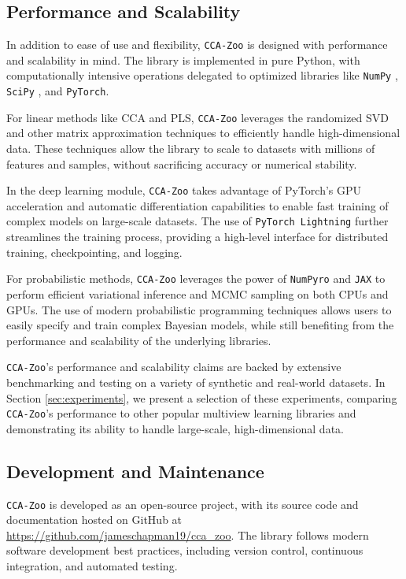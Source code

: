 \subsection{Performance and Scalability}

In addition to ease of use and flexibility, \texttt{CCA-Zoo} is designed with performance and scalability in mind. The library is implemented in pure Python, with computationally intensive operations delegated to optimized libraries like \texttt{NumPy} \citep{harris2020array}, \texttt{SciPy} \citep{virtanen2020scipy}, and \texttt{PyTorch}.

For linear methods like CCA and PLS, \texttt{CCA-Zoo} leverages the randomized SVD and other matrix approximation techniques to efficiently handle high-dimensional data. These techniques allow the library to scale to datasets with millions of features and samples, without sacrificing accuracy or numerical stability.

In the deep learning module, \texttt{CCA-Zoo} takes advantage of PyTorch's GPU acceleration and automatic differentiation capabilities to enable fast training of complex models on large-scale datasets. The use of \texttt{PyTorch Lightning} further streamlines the training process, providing a high-level interface for distributed training, checkpointing, and logging.

For probabilistic methods, \texttt{CCA-Zoo} leverages the power of \texttt{NumPyro} and \texttt{JAX} to perform efficient variational inference and MCMC sampling on both CPUs and GPUs. The use of modern probabilistic programming techniques allows users to easily specify and train complex Bayesian models, while still benefiting from the performance and scalability of the underlying libraries.

\texttt{CCA-Zoo}'s performance and scalability claims are backed by extensive benchmarking and testing on a variety of synthetic and real-world datasets. In Section \ref{sec:experiments}, we present a selection of these experiments, comparing \texttt{CCA-Zoo}'s performance to other popular multiview learning libraries and demonstrating its ability to handle large-scale, high-dimensional data.

\subsection{Development and Maintenance}

\texttt{CCA-Zoo} is developed as an open-source project, with its source code and documentation hosted on GitHub at \url{https://github.com/jameschapman19/cca_zoo}. The library follows modern software development best practices, including version control, continuous integration, and automated testing.

